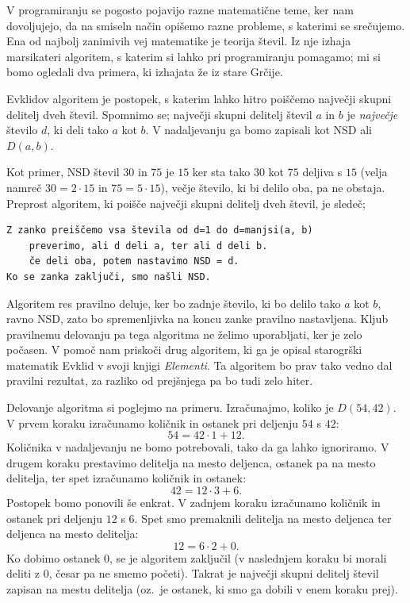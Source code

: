 V programiranju se pogosto pojavijo razne matematične teme, ker nam dovoljujejo,
da na smiseln način opišemo razne probleme, s katerimi se srečujemo.
Ena od najbolj zanimivih vej matematike je teorija števil.
Iz nje izhaja marsikateri algoritem, s katerim si lahko pri programiranju
pomagamo; mi si bomo ogledali dva primera, ki izhajata že iz stare Grčije.


Evklidov algoritem je postopek, s katerim lahko hitro poiščemo največji skupni
delitelj dveh števil.
Spomnimo se; največji skupni delitelj števil $a$ in $b$ je \emph{največje}
število $d$, ki deli tako $a$ kot $b$.
V nadaljevanju ga bomo zapisali kot NSD ali $D(a, b)$.

Kot primer, NSD števil $30$ in $75$ je $15$ ker sta tako $30$ kot $75$ deljiva s
$15$ (velja namreč $30 = 2 \cdot 15$ in $75 = 5 \cdot 15$), večje število, ki bi
delilo oba, pa ne obstaja.
Preprost algoritem, ki poišče največji skupni delitelj dveh števil, je sledeč;
\begin{verbatim}
Z zanko preiščemo vsa števila od d=1 do d=manjsi(a, b)
    preverimo, ali d deli a, ter ali d deli b.
    če deli oba, potem nastavimo NSD = d.
Ko se zanka zaključi, smo našli NSD.
\end{verbatim}
Algoritem res pravilno deluje, ker bo zadnje število, ki bo delilo tako $a$ kot
$b$, ravno NSD, zato bo spremenljivka na koncu zanke pravilno nastavljena.
Kljub pravilnemu delovanju pa tega algoritma ne želimo uporabljati, ker je zelo
počasen.
V pomoč nam priskoči drug algoritem, ki ga je opisal starogrški matematik Evklid
v svoji knjigi \emph{Elementi}.
Ta algoritem bo prav tako vedno dal pravilni rezultat, za razliko od prejšnjega
pa bo tudi zelo hiter.

Delovanje algoritma si poglejmo na primeru.
Izračunajmo, koliko je $D(54, 42)$.
V prvem koraku izračunamo količnik in ostanek pri deljenju $54$ s $42$:
\[
  54 = 42 \cdot 1 + 12.
\]
Količnika v nadaljevanju ne bomo potrebovali, tako da ga lahko ignoriramo.
V drugem koraku prestavimo delitelja na mesto deljenca, ostanek pa na mesto
delitelja, ter spet izračunamo količnik in ostanek:
\[
  42 = 12 \cdot 3 + 6.
\]
Postopek bomo ponovili še enkrat.
V zadnjem koraku izračunamo količnik in ostanek pri deljenju $12$ s $6$.
Spet smo premaknili delitelja na mesto deljenca ter deljenca na mesto delitelja:
\[
  12 = 6 \cdot 2 + 0.
\]
Ko dobimo ostanek $0$, se je algoritem zaključil (v naslednjem koraku bi
morali deliti z $0$, česar pa ne smemo početi).
Takrat je največji skupni delitelj števil zapisan na mestu delitelja (oz.~je
ostanek, ki smo ga dobili v enem koraku prej).

